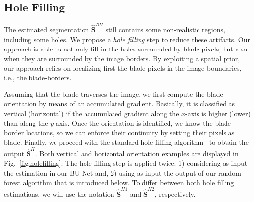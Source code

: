 \subsection{Hole Filling}
\label{hole_filling}


The estimated segmentation $\hat{\mathbf{S}}^{BU}$ still contains some non-realistic regions, including some holes. We propose a {\em hole filling} step to reduce these artifacts. Our approach is able to not only fill in the holes surrounded by blade pixels, but also when they are surrounded by the image borders. By exploiting a spatial prior, our approach relies on localizing first the blade pixels in the image boundaries, i.e., the blade-borders.


Assuming that the blade traverses the image, we first compute the blade orientation by means of an accumulated gradient. Basically, it is classified as vertical (horizontal) if the accumulated gradient along the $x$-axis is higher (lower) than along the $y$-axis. Once the orientation is identified, we know the blade-border locations, so we can enforce their continuity by setting their pixels as blade. Finally, we proceed with the standard hole filling algorithm~\cite{fill} to obtain the output $\hat{\mathbf{S}}^{H}$. Both vertical and horizontal orientation examples are displayed in Fig.~\ref{fig:holefilling}. The hole filling step is applied twice: 1) considering as input the estimation in our BU-Net and, 2) using as input the output of our random forest algorithm that is introduced below. To differ between both hole filling estimations, we will use the notation $\hat{\mathbf{S}}^{H1}$ and $\hat{\mathbf{S}}^{H2}$, respectively. 





